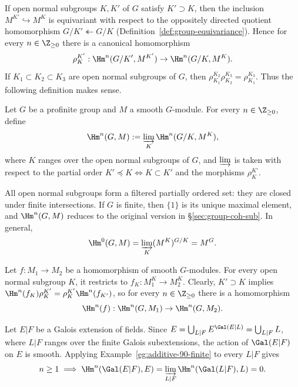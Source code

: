 If open normal subgroups $K,K'$ of $G$ satisfy $K'\supset K$, then the
inclusion $M^{K'}\hookrightarrow M^K$ is equivariant with respect to the
oppositely directed quotient homomorphism $G/K'\twoheadleftarrow G/K$
(Definition~\ref{def:group-equivariance}). Hence for every
$n\in\Z_{\geq0}$ there is a canonical homomorphism
\[ \rho^{K'}_K:\Hm^n(G/K',M^{K'})\to\Hm^n(G/K,M^K). \]
If $K_1\subset K_2\subset K_3$ are open normal subgroups of $G$, then
$\rho^{K_2}_{K_1}\rho^{K_3}_{K_2}=\rho^{K_3}_{K_1}$. Thus the following
definition makes sense.

\begin{definition}
	Let $G$ be a profinite group and $M$ a smooth $G$-module. For every
	$n\in\Z_{\geq0}$, define
	\[ \Hm^n(G,M):=\varinjlim_K\Hm^n(G/K,M^K), \]
	where $K$ ranges over the open normal subgroups of $G$, and $\varinjlim$
	is taken with respect to the partial order
	$K'\preceq K\iff K\subset K'$ and the morphisms $\rho^{K'}_K$.
\end{definition}

All open normal subgroups form a filtered partially ordered set: they are
closed under finite intersections. If $G$ is finite, then $\{1\}$ is its
unique maximal element, and $\Hm^n(G,M)$ reduces to the original version in
\S\ref{sec:group-coh-sub}. In general,
\[ \Hm^0(G,M)=\varinjlim_K(M^K)^{G/K}=M^G. \]

Let $f:M_1\to M_2$ be a homomorphism of smooth $G$-modules. For every open
normal subgroup $K$, it restricts to
$f_K:M_1^K\to M_2^K$. Clearly, $K'\supset K$ implies
$\Hm^n(f_K)\rho^{K'}_K=\rho^{K'}_K\Hm^n(f_{K'})$, so for every
$n\in\Z_{\geq0}$ there is a homomorphism
\[ \Hm^n(f):\Hm^n(G,M_1)\to\Hm^n(G,M_2). \]

\begin{example}
	Let $E|F$ be a Galois extension of fields. Since
	$E=\bigcup_{L|F}E^{\Gal(E|L)}=\bigcup_{L|F}L$, where $L|F$ ranges over
	the finite Galois subextensions, the action of $\Gal(E|F)$ on $E$ is
	smooth. Applying Example~\ref{eg:additive-90-finite} to every $L|F$
	gives
	\[ n\geq1\implies\Hm^n(\Gal(E|F),E)
	=\varinjlim_{L|F}\Hm^n(\Gal(L|F),L)=0. \]
\end{example}

